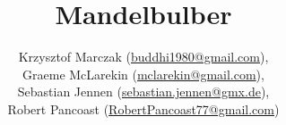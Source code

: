 % 
%





\newcommand{\mTitle}{Mandelbulber}
\newcommand{\mSubtitle}{End User Manual}
\newcommand{\mVersionDocument}{2.11.0.9.5}
\newcommand{\mDateDocument}{2017-April}
\newcommand{\mAuthor}{
	
Krzysztof Marczak (\href{mailto:buddhi1980@gmail.com}{buddhi1980@gmail.com}),

Graeme McLarekin (\href{mailto:mclarekin@gmail.com}{mclarekin@gmail.com}),

Sebastian Jennen (\href{mailto:sebastian.jennen@gmx.de}{sebastian.jennen@gmx.de}),

Robert Pancoast (\href{mailto:RobertPancoast77@gmail.com}{RobertPancoast77@gmail.com})}


\title{\mTitle}
\author{\mAuthor}




